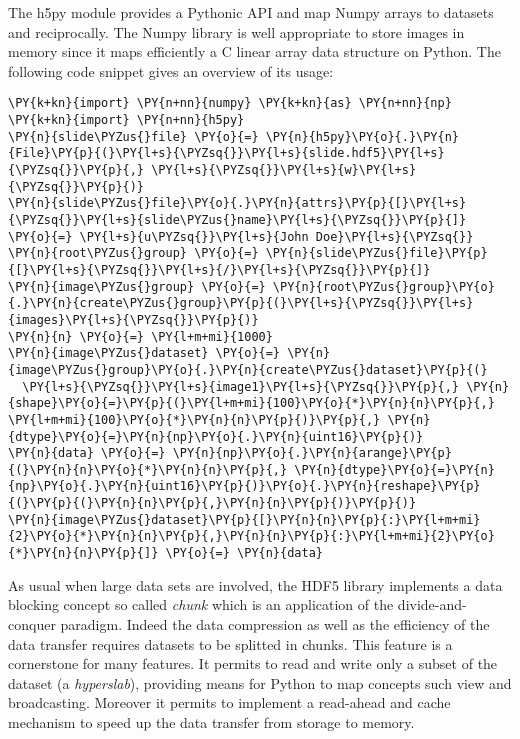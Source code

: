 \documentclass[letterpaper,compsoc,twoside]{IEEEtran}
\makeatletter
\def\PY@reset{\let\PY@it=\relax \let\PY@bf=\relax \let\PY@ul=\relax \let\PY@tc=\relax \let\PY@bc=\relax \let\PY@ff=\relax}
\def\PY@tok#1{\csname PY@tok@#1\endcsname}
\def\PY@toks#1+{\ifx\relax#1\empty\else \PY@tok{#1}\expandafter\PY@toks\fi}
\def\PY@do#1{\PY@bc{\PY@tc{\PY@ul{\PY@it{\PY@bf{\PY@ff{#1}}}}}}}
\def\PY#1#2{\PY@reset\PY@toks#1+\relax+\PY@do{#2}}
\def\PYZus{\char`\_}
\def\PYZsq{\char`\'}
\makeatother
\begin{document}
The h5py module provides a Pythonic API and map Numpy \cite{Numpy} arrays to datasets and reciprocally.
The Numpy library is well appropriate to store images in memory since it maps efficiently a C linear
array data structure on Python. The following code snippet gives an overview of its usage:\begin{Verbatim}[commandchars=\\\{\},fontsize=\footnotesize]
\PY{k+kn}{import} \PY{n+nn}{numpy} \PY{k+kn}{as} \PY{n+nn}{np}
\PY{k+kn}{import} \PY{n+nn}{h5py}
\PY{n}{slide\PYZus{}file} \PY{o}{=} \PY{n}{h5py}\PY{o}{.}\PY{n}{File}\PY{p}{(}\PY{l+s}{\PYZsq{}}\PY{l+s}{slide.hdf5}\PY{l+s}{\PYZsq{}}\PY{p}{,} \PY{l+s}{\PYZsq{}}\PY{l+s}{w}\PY{l+s}{\PYZsq{}}\PY{p}{)}
\PY{n}{slide\PYZus{}file}\PY{o}{.}\PY{n}{attrs}\PY{p}{[}\PY{l+s}{\PYZsq{}}\PY{l+s}{slide\PYZus{}name}\PY{l+s}{\PYZsq{}}\PY{p}{]} \PY{o}{=} \PY{l+s}{u\PYZsq{}}\PY{l+s}{John Doe}\PY{l+s}{\PYZsq{}}
\PY{n}{root\PYZus{}group} \PY{o}{=} \PY{n}{slide\PYZus{}file}\PY{p}{[}\PY{l+s}{\PYZsq{}}\PY{l+s}{/}\PY{l+s}{\PYZsq{}}\PY{p}{]}
\PY{n}{image\PYZus{}group} \PY{o}{=} \PY{n}{root\PYZus{}group}\PY{o}{.}\PY{n}{create\PYZus{}group}\PY{p}{(}\PY{l+s}{\PYZsq{}}\PY{l+s}{images}\PY{l+s}{\PYZsq{}}\PY{p}{)}
\PY{n}{n} \PY{o}{=} \PY{l+m+mi}{1000}
\PY{n}{image\PYZus{}dataset} \PY{o}{=} \PY{n}{image\PYZus{}group}\PY{o}{.}\PY{n}{create\PYZus{}dataset}\PY{p}{(}
  \PY{l+s}{\PYZsq{}}\PY{l+s}{image1}\PY{l+s}{\PYZsq{}}\PY{p}{,} \PY{n}{shape}\PY{o}{=}\PY{p}{(}\PY{l+m+mi}{100}\PY{o}{*}\PY{n}{n}\PY{p}{,} \PY{l+m+mi}{100}\PY{o}{*}\PY{n}{n}\PY{p}{)}\PY{p}{,} \PY{n}{dtype}\PY{o}{=}\PY{n}{np}\PY{o}{.}\PY{n}{uint16}\PY{p}{)}
\PY{n}{data} \PY{o}{=} \PY{n}{np}\PY{o}{.}\PY{n}{arange}\PY{p}{(}\PY{n}{n}\PY{o}{*}\PY{n}{n}\PY{p}{,} \PY{n}{dtype}\PY{o}{=}\PY{n}{np}\PY{o}{.}\PY{n}{uint16}\PY{p}{)}\PY{o}{.}\PY{n}{reshape}\PY{p}{(}\PY{p}{(}\PY{n}{n}\PY{p}{,}\PY{n}{n}\PY{p}{)}\PY{p}{)}
\PY{n}{image\PYZus{}dataset}\PY{p}{[}\PY{n}{n}\PY{p}{:}\PY{l+m+mi}{2}\PY{o}{*}\PY{n}{n}\PY{p}{,}\PY{n}{n}\PY{p}{:}\PY{l+m+mi}{2}\PY{o}{*}\PY{n}{n}\PY{p}{]} \PY{o}{=} \PY{n}{data}
\end{Verbatim}
As usual when large data sets are involved, the HDF5 library implements a data blocking concept so
called \emph{chunk} which is an application of the divide-and-conquer paradigm. Indeed the data compression
as well as the efficiency of the data transfer requires datasets to be splitted in chunks. This feature
is a cornerstone for many features. It permits to read and write only a subset of the
dataset (a \emph{hyperslab}), providing means for Python to map concepts such view and
broadcasting. Moreover it permits to implement a read-ahead and cache mechanism to speed up the data
transfer from storage to memory.
\end{document}

